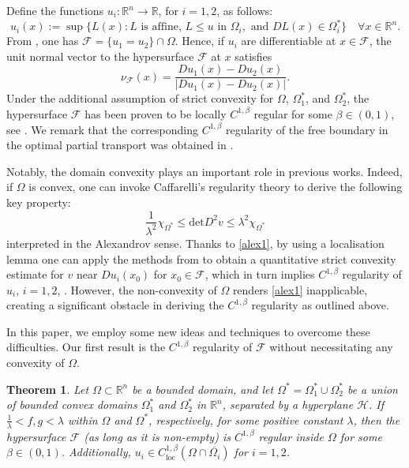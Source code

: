 \documentclass[11pt]{amsart}
\theoremstyle{plain}
\newtheorem{theorem}{Theorem}[section]
\renewcommand{\det}{\mbox{det}}
\newcommand{\0}{\textbf{0}}
\numberwithin{equation}{section}
\numberwithin{equation}{section}
\numberwithin{figure}{section}
\begin{document}
Define the functions $u_i : \mathbb{R}^n\rightarrow \mathbb{R}$, for $i = 1, 2$, as follows:
	\begin{equation}\label{uidef}
    		u_i(x) := \sup\{L(x) : L \text{ is affine, } L \leq u \text{ in } \Omega_i, \text{ and } DL(x) \in \Omega_i^*\} \quad \forall x\in \mathbb{R}^n.
	\end{equation}
From \cite{CL1, KM1}, one has $\mathcal{F} = \{u_1 = u_2\} \cap \Omega$. 
Hence, if $u_i$ are differentiable at $x \in \mathcal{F}$, the unit normal vector to the hypersurface $\mathcal{F}$ at $x$ satisfies
\begin{equation}\label{gn1} 
    \nu_\mathcal{F}(x) = \frac{Du_1(x) - Du_2(x)}{|Du_1(x) - Du_2(x)|}.
\end{equation}
Under the additional assumption of strict convexity for $\Omega$, $\Omega^*_1$, and $\Omega^*_2$, the hypersurface $\mathcal{F}$ has been proven to be locally $C^{1,\beta}$ regular for some $\beta \in (0, 1)$, see \cite{CL1, KM1}.
We remark that the corresponding $C^{1,\beta}$ regularity of the free boundary in the optimal partial transport was obtained in \cite{CM,I}.


\vskip5pt
Notably, the domain convexity plays an important role in previous works.
Indeed, if $\Omega$ is convex, one can invoke Caffarelli's regularity theory \cite{C92} to derive the following key property:
\begin{equation}\label{alex1}
\frac{1}{\lambda^2}\chi_{{\Omega^*}}\leq \det D^2v\leq \lambda^2\chi{_{\Omega^*}}
\end{equation}
interpreted in the Alexandrov sense. Thanks to \eqref{alex1}, by using a localisation lemma one can apply the methods from \cite{C92b} to obtain a quantitative strict convexity estimate for $v$ near $Du_i(x_0)$ for $x_0\in\mathcal{F}$, which in turn implies $C^{1,\beta}$ regularity of $u_i$, $i=1,2$, \cite{CL1, KM1}. 
However, the non-convexity of $\Omega$ renders \eqref{alex1} inapplicable, creating a significant obstacle in deriving the $C^{1,\beta}$ regularity as outlined above.


In this paper, we employ some new ideas and techniques to overcome these difficulties.
Our first result is the $C^{1,\beta}$ regularity of $\mathcal{F}$ without necessitating any convexity of $\Omega$.

\begin{theorem}\label{t111}
Let $\Omega\subset\mathbb{R}^n$ be a bounded domain, and let $\Omega^* = \Omega^*_1 \cup \Omega^*_2$ be a union of bounded convex domains $\Omega^*_1$ and $\Omega^*_2$ in $\mathbb{R}^n$, separated by a hyperplane $\mathcal{H}$. If $\frac{1}{\lambda} < f, g < \lambda$ within $\Omega$ and $\Omega^*$, respectively, for some positive constant $\lambda$, then the hypersurface $\mathcal{F}$ (as long as it is non-empty) is $C^{1,\beta}$ regular inside $\Omega$ for some $\beta \in (0, 1)$. Additionally, $u_i \in C_{\text{loc}}^{1,\beta}(\Omega \cap \overline{\Omega_i})$ for $i = 1, 2$.
\end{theorem}
\end{document}
